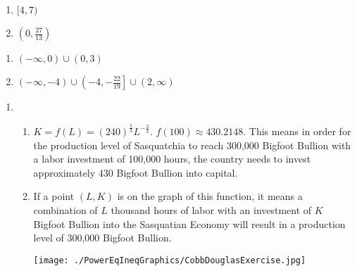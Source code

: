 \begin{multicols}{2}
\begin{enumerate}
\setcounter{enumi}{\value{HW}}

\item $[4,7)$  
\item $\left(0, \frac{27}{13} \right)$

\setcounter{HW}{\value{enumi}}
\end{enumerate}
\end{multicols}

\begin{enumerate}
\setcounter{enumi}{\value{HW}}
\item $(-\infty, 0) \cup (0,3)$   \vphantom{$(-\infty, -4) \cup \left(-4, -\frac{22}{19}\right] \cup (2, \infty)$}
\item $(-\infty, -4) \cup \left(-4, -\frac{22}{19}\right] \cup (2, \infty)$

\setcounter{HW}{\value{enumi}}
\end{enumerate}

\begin{enumerate}
\setcounter{enumi}{\value{HW}}
\item \begin{enumerate}

\item $K=f(L) = (240)^{ \frac{5}{3}} L^{- \frac{2}{3}}$.  $f(100)  \approx 430.2148$.  This means in order for the production level of Sasquatchia to reach 300,000 Bigfoot Bullion with a labor investment of 100,000 hours, the country needs to invest approximately 430 Bigfoot Bullion into capital.


\item If a point $(L,K)$ is on the graph of this function, it means a combination of $L$ thousand hours of labor with an investment of $K$ Bigfoot Bullion into the Sasquatian Economy will result in a production level of 300,000 Bigfoot Bullion.

\medskip

\begin{center}
\texttt{[image: ./PowerEqIneqGraphics/CobbDouglasExercise.jpg]}
\end{center}

\end{enumerate}

\end{enumerate}